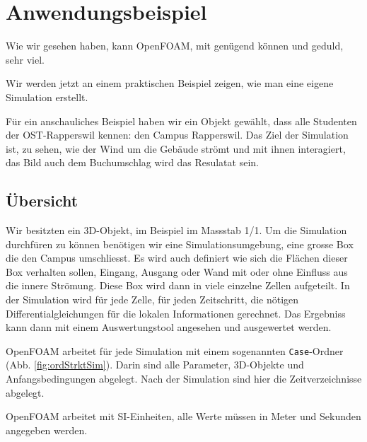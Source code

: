 %
%
%
%
\section{Anwendungsbeispiel
\label{openfoam:section:Anwendungsbeispiel}}
Wie wir gesehen haben, kann OpenFOAM, mit genügend können und geduld, sehr viel.

Wir werden jetzt an einem praktischen Beispiel zeigen, wie man eine eigene Simulation erstellt.

Für ein anschauliches Beispiel haben wir ein Objekt gewählt, dass alle Studenten der OST-Rapperswil kennen: den Campus Rapperswil.
Das Ziel der Simulation ist, zu sehen, wie der Wind um die Gebäude strömt und mit ihnen interagiert, das Bild auch dem Buchumschlag wird das Resulatat sein.

\subsection{Übersicht \label{openfoam:section:Übersicht}}
Wir besitzten ein 3D-Objekt, im Beispiel im Massstab 1/1.
Um die Simulation durchfüren zu können benötigen wir eine Simulationsumgebung, eine grosse Box die den Campus umschliesst.
Es wird auch definiert wie sich die Flächen dieser Box verhalten sollen, Eingang, Ausgang oder Wand 
mit oder ohne Einfluss aus die innere Strömung.
Diese Box wird dann in viele einzelne Zellen aufgeteilt.
In der Simulation wird für jede Zelle, für jeden Zeitschritt, 
die nötigen Differentialgleichungen für die lokalen Informationen gerechnet.
Das Ergebniss kann dann mit einem Auswertungstool angesehen und ausgewertet werden.

OpenFOAM arbeitet für jede Simulation mit einem sogenannten \texttt{Case}-Ordner (Abb. \ref{fig:ordStrktSim}). 
Darin sind alle Parameter, 3D-Objekte und Anfangsbedingungen abgelegt.
Nach der Simulation sind hier die Zeitverzeichnisse abgelegt.

\begin{center}
        OpenFOAM arbeitet mit SI-Einheiten, alle Werte müssen in Meter und Sekunden angegeben werden.
\end{center}

